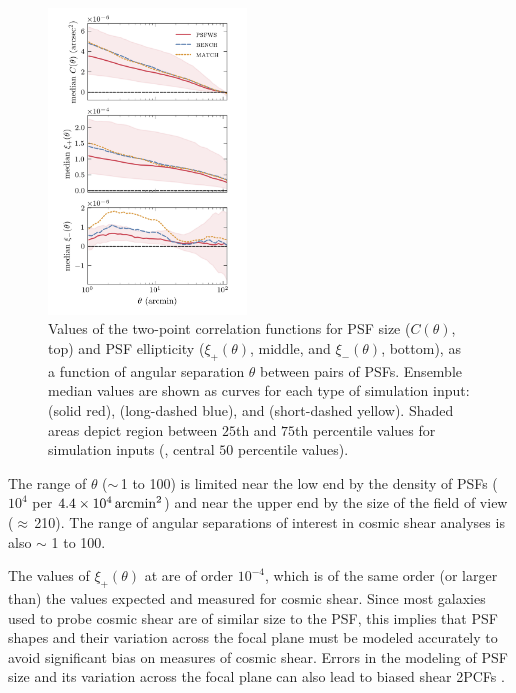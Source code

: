 \documentclass[twocolumn]{aastex631}
\begin{document}
\begin{figure}
\includegraphics[width=0.47\textwidth]{f5_1d2pcf_ensemble.png}
    \caption{
    Values of the two-point correlation functions for PSF size ($C(\theta)$, top) and PSF ellipticity ($\xi_+(\theta)$, middle, and $\xi_-(\theta)$, bottom), as a function of angular separation $\theta$ between pairs of PSFs. 
    Ensemble median values are shown as curves for each type of simulation input: \psfwssims (solid red), \bench (long-dashed blue), and \match (short-dashed yellow).
    Shaded areas depict region between $25$th and $75$th percentile values for \psfwssims simulation inputs (\ie, central $50$ percentile values).
    \label{fig:1d2pcf}
    }
\end{figure}

The range of $\theta$ ($\sim$\,1 to 100\amin) is limited near the low end by the density of PSFs ($10^4$ per $4.4\times 10^4 \mathrm{\,arcmin}^2$) and near the upper end by the size of the field of view ($\approx$\,210\amin ). 
The range of angular separations of interest in cosmic shear analyses is also $\sim$ 1 to 100\amin \citep[see, for example,][]{asgari_kids-1000_2021,amon_dark_2022, li_hyper_2023}.

The values of $\xi_+(\theta)$ at \smallsep are of order $10^{-4}$, which is of the same order (or larger than) the values expected and measured for cosmic shear.  
Since most galaxies used to probe cosmic shear are of similar size to the PSF, this implies that PSF shapes and their variation across the focal plane must be modeled accurately to avoid significant bias on measures of cosmic shear.  
Errors in the modeling of PSF size and its variation across the focal plane can also lead to biased shear 2PCFs \citep{rowe_improving_2010,jarvis_science_2016}.
\end{document}
